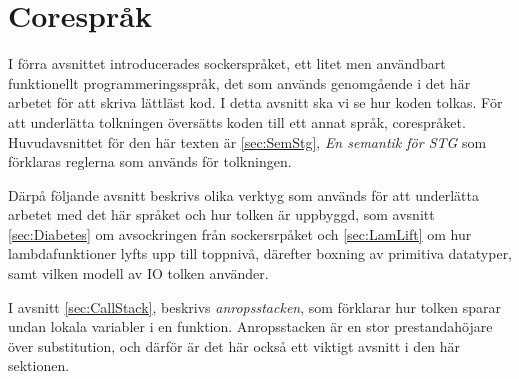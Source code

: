 \documentclass[Rapport]{subfiles}
\begin{document}
\section{Corespråk}
\label{sec:Core}


\overviewCore


I förra avsnittet introducerades sockerspråket, ett litet men användbart
funktionellt programmeringsspråk, det som används genomgående i det här
arbetet för att skriva lättläst kod.
    I detta avsnitt ska vi se hur koden tolkas. För att underlätta
tolkningen översätts koden till ett annat språk, corespråket. 
Huvudavsnittet för den här texten är \ref{sec:SemStg}, \emph{En semantik för STG}
som förklaras reglerna som används för
tolkningen. 

Därpå följande avsnitt beskrivs olika verktyg som används för att
underlätta arbetet med det här språket och hur tolken är uppbyggd,
som avsnitt \ref{sec:Diabetes} om avsockringen från sockersrpåket och \ref{sec:LamLift} 
om hur lambdafunktioner lyfts upp till toppnivå, därefter
boxning av primitiva datatyper, samt vilken modell av IO tolken använder.

I avsnitt \ref{sec:CallStack}, beskrivs \emph{anropsstacken}, som förklarar hur tolken
sparar undan lokala variabler i en funktion. Anropsstacken är en 
stor prestandahöjare över substitution, och därför är det här också ett
viktigt avsnitt i den här sektionen.



%








\end{document}
